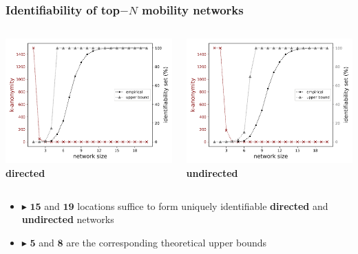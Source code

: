 \documentclass[hyperref={colorlinks = true},unknownkeysallowed]{beamer}
\begin{document}
\begin{frame}
	\frametitle{Identifiability of  top$-N$ mobility networks}
	\begin{columns}
		\begin{column}[t]{0.49\textwidth}
			\centering \includegraphics[width=1.05\textwidth]{figs/k_anonymity_dir_.pdf}
			\\ \textbf{directed}
		\end{column}
		\begin{column}[t]{0.49\textwidth}
			\centering \includegraphics[width=1.05\textwidth]{figs/k_anonymity_undirected_.pdf}
			\\ \textbf{undirected}
		\end{column}
	\end{columns}
	\begin{itemize}
		\item  $\blacktriangleright$ $\mathbf{15}$ and $\mathbf{19}$ locations suffice to form uniquely identifiable
		\textbf{directed} and \textbf{undirected} networks 
		\item  $\blacktriangleright$ $\mathbf{5}$ and $\mathbf{8}$  are the corresponding theoretical upper bounds
	\end{itemize}
\end{frame}
\end{document}
